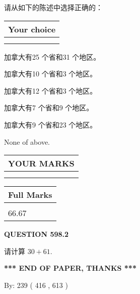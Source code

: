 \documentclass{ctexart}
\begin{document}
  
请从如下的陈述中选择正确的：
  
  
\noindent\hspace{3.0in} \begin{tabular}{|l|}
\hline
Your choice \\
\hline
 \\ 
 \\ 
\hline
\end{tabular}
  
  
 
 
加拿大有25 个省和31 个地区。
 
 
加拿大有10 个省和3 个地区。
 
 
加拿大有12 个省和3 个地区。
 
 
加拿大有7 个省和9 个地区。
 
 
加拿大有9 个省和23 个地区。
 
 
 None of above.
 
 
  
\vspace{0.2in}
  
\noindent\begin{tabular}{|l|}
\hline
 YOUR MARKS  \\
\hline
 \\ 
 \\ 
\hline
\end{tabular}
\hspace{0.05in} \begin{tabular}{|l|}
\hline
 Full Marks  \\
\hline
 \\ 
66.67 \\
\hline
\end{tabular}
{\textbf{\Large{QUESTION
598.2 
}}}
  
  
 
请计算 $ %
30 +  %
61 $.
 

 

 
   
   
 \vspace{0.2in}
 
   
   
   
   
\vspace{1.0in} 
{\textbf{\large{ *** END OF PAPER, THANKS *** }}} 
   
   
\hspace{1.0in} By: 
 239 ( 416 ,  613 )
   
\end{document}
